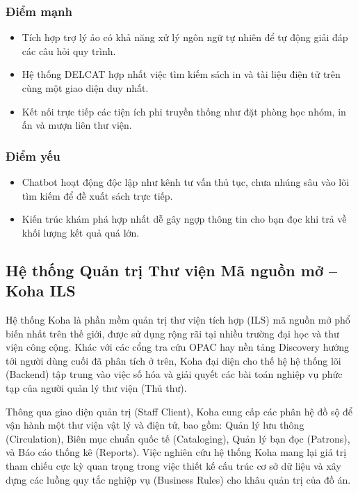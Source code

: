 \subsubsection{Điểm mạnh}
\begin{itemize}
\item Tích hợp trợ lý ảo có khả năng xử lý ngôn ngữ tự nhiên để tự động giải đáp các câu hỏi quy trình.
\item Hệ thống DELCAT hợp nhất việc tìm kiếm sách in và tài liệu điện tử trên cùng một giao diện duy nhất.
\item Kết nối trực tiếp các tiện ích phi truyền thống như đặt phòng học nhóm, in ấn và mượn liên thư viện.
\end{itemize}

\subsubsection{Điểm yếu}
\begin{itemize}
\item Chatbot hoạt động độc lập như kênh tư vấn thủ tục, chưa nhúng sâu vào lõi tìm kiếm để đề xuất sách trực tiếp.
\item Kiến trúc khám phá hợp nhất dễ gây ngợp thông tin cho bạn đọc khi trả về khối lượng kết quả quá lớn.
\end{itemize}


\subsection{Hệ thống Quản trị Thư viện Mã nguồn mở – Koha ILS}

Hệ thống Koha là phần mềm quản trị thư viện tích hợp (ILS) mã nguồn mở phổ biến nhất trên thế giới, được sử dụng rộng rãi tại nhiều trường đại học và thư viện công cộng. Khác với các cổng tra cứu OPAC hay nền tảng Discovery hướng tới người dùng cuối đã phân tích ở trên, Koha đại diện cho thế hệ hệ thống lõi (Backend) tập trung vào việc số hóa và giải quyết các bài toán nghiệp vụ phức tạp của người quản lý thư viện (Thủ thư).

Thông qua giao diện quản trị (Staff Client), Koha cung cấp các phân hệ đồ sộ để vận hành một thư viện vật lý và điện tử, bao gồm: Quản lý lưu thông (Circulation), Biên mục chuẩn quốc tế (Cataloging), Quản lý bạn đọc (Patrons), và Báo cáo thống kê (Reports). Việc nghiên cứu hệ thống Koha mang lại giá trị tham chiếu cực kỳ quan trọng trong việc thiết kế cấu trúc cơ sở dữ liệu và xây dựng các luồng quy tắc nghiệp vụ (Business Rules) cho khâu quản trị của đồ án.

